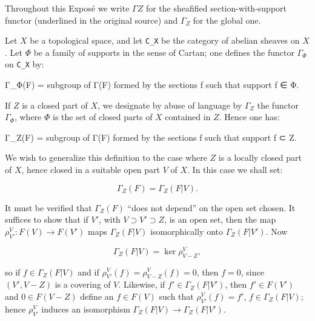 \documentclass[
]{article}
\newenvironment{Shaded}{}{}
\newcommand{\NormalTok}[1]{#1}
\begin{document}
Throughout this Exposé we write \(\Gamma Z\) for the sheafified
section-with-support functor (underlined in the original source) and
\(\Gamma_{Z}\) for the global one.

Let \(X\) be a topological space, and let \texttt{C\_X} be the category
of abelian sheaves on \(X\). Let \(\Phi\) be a family of supports in the
sense of Cartan; one defines the functor \(\Gamma_{\Phi}\) on
\texttt{C\_X} by:

\begin{Shaded}
\begin{Highlighting}[]
\NormalTok{Γ\_Φ(F) = subgroup of Γ(F) formed by the sections f such that support f ∈ Φ.}
\end{Highlighting}
\end{Shaded}

If \(Z\) is a closed part of \(X\), we designate by abuse of language by
\(\Gamma_{Z}\) the functor \(\Gamma_{\Phi}\), where \(\Phi\) is the set
of closed parts of \(X\) contained in \(Z\). Hence one has:

\begin{Shaded}
\begin{Highlighting}[]
\NormalTok{Γ\_Z(F) = subgroup of Γ(F) formed by the sections f such that support f ⊂ Z.}
\end{Highlighting}
\end{Shaded}

We wish to generalize this definition to the case where \(Z\) is a
locally closed part of \(X\), hence closed in a suitable open part \(V\)
of \(X\). In this case we shall set:

\[
\Gamma_{Z}(F) = \Gamma_{Z}(F|V).
\]

It must be verified that \(\Gamma_{Z}(F)\) ``does not depend'' on the
open set chosen. It suffices to show that if \(V'\), with
\(V \supset V' \supset Z\), is an open set, then the map
\(\rho^{V}_{V'}: F(V) \to F(V')\) maps \(\Gamma_{Z}(F|V)\)
isomorphically onto \(\Gamma_{Z}(F|V')\). Now

\[
\Gamma_{Z}(F|V) = \ker \rho^{V}_{V-Z},
\]

so if \(f \in \Gamma_{Z}(F|V)\) and if
\(\rho^{V}_{V'}(f) = \rho^{V}_{V-Z}(f) = 0\), then \(f = 0\), since
\((V', V - Z)\) is a covering of \(V\). Likewise, if
\(f' \in \Gamma_{Z}(F|V')\), then \(f' \in F(V')\) and
\(0 \in F(V - Z)\) define an \(f \in F(V)\) such that
\(\rho^{V}_{V'}(f) = f'\), \(f \in \Gamma_{Z}(F|V)\); hence
\(\rho^{V}_{V'}\) induces an isomorphism
\(\Gamma_{Z}(F|V) \to \Gamma_{Z}(F|V')\).
\end{document}

